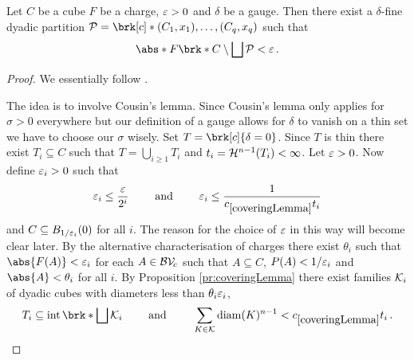 \begin{lemma}\label{le:DisjointCube}
Let $C$ be a cube $F$ be a charge, $\varepsilon>0$ and $\delta$ be a gauge. Then there exist a $\delta$-fine dyadic partition $\cP=\brk[c]*{(C_1,x_1),\dots,(C_q,x_q)}$ such that
\begin{align*}
	\abs*{F\brk*{C\setminus\bigsqcup\cP}}<\e\,.
\end{align*}
\end{lemma}
\begin{proof}

We essentially follow \cite[Lemma 2.6.4]{Pfe2001}.

The idea is to involve Cousin's lemma. Since Cousin's lemma only applies for $\sigma>0$ everywhere but our definition of a gauge allows for $\delta$ to vanish on a thin set we have to choose our $\sigma$ wisely.
Set $T=\brk[c]{\delta=0}$. Since $T$ is thin there exist $T_i\subseteq C$ such that $T=\bigcup_{i\geq1}T_i$ and $t_i=\mathcal{H}^{n-1}(T_i)<\infty$.
Let $\varepsilon>0$. 
Now define $\varepsilon_i>0$ such that
\begin{align*}
	\e_i\leq \frac{\e}{2^i}\qquad\text{ and }\qquad\e_i\leq \frac{1}{\useconstant{coveringLemma}t_i}
\end{align*}
and $C\subseteq B_{1/\varepsilon_i}(0)$ for all $i$. The reason for the choice of $\varepsilon$ in this way will become clear later.
By the alternative characterisation of charges there exist $\theta_i$ such that $\abs{F(A)}<\e_i$ for each $A\in\mathcal{BV\!}_c$ such that $A\subseteq C$, $P(A)<1/\varepsilon_i$ and $\abs{A}<\theta_i$ for all $i$.
By Proposition \ref{pr:coveringLemma} there exist families $\mathcal{K}_i$ of dyadic cubes with diameters less than $\theta_i\varepsilon_i$, 
\begin{align*}
	T_i\subseteq \interior\brk*{\bigsqcup\cK_i}
	\qquad\text{ and }\qquad
	\sum_{K\in\cK}\diam(K)^{n-1}<\useconstant{coveringLemma} t_i\,.
\end{align*}


\end{proof}
